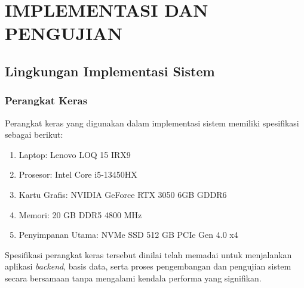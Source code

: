 \chapter{IMPLEMENTASI DAN PENGUJIAN}

\section{Lingkungan Implementasi Sistem}

\subsection{Perangkat Keras}
Perangkat keras yang digunakan dalam implementasi sistem memiliki spesifikasi sebagai berikut:
\begin{enumerate}
    \item Laptop: Lenovo LOQ 15 IRX9
    \item Prosesor: Intel Core i5-13450HX
    \item Kartu Grafis: NVIDIA GeForce RTX 3050 6GB GDDR6
    \item Memori: 20 GB DDR5 4800 MHz
    \item Penyimpanan Utama: NVMe SSD 512 GB PCIe Gen 4.0 x4
\end{enumerate}
Spesifikasi perangkat keras tersebut dinilai telah memadai untuk menjalankan aplikasi \textit{backend}, basis data, serta proses pengembangan dan pengujian sistem secara bersamaan tanpa mengalami kendala performa yang signifikan.

